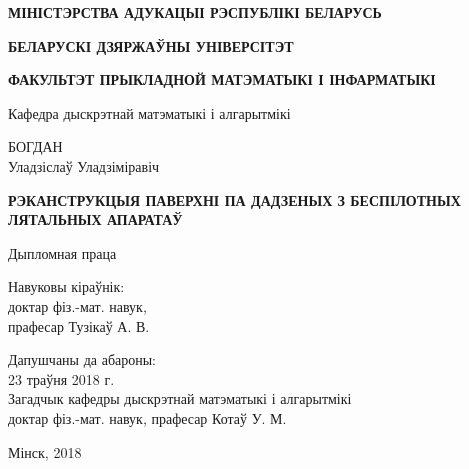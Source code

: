 \begin{titlepage}
    \begin{center}
        {\bf МІНІСТЭРСТВА АДУКАЦЫІ РЭСПУБЛІКІ БЕЛАРУСЬ}
    \end{center}
    \begin{center}
        {\bf БЕЛАРУСКІ ДЗЯРЖАЎНЫ УНІВЕРСІТЭТ}
    \end{center}
    \begin{center}
        {\bf ФАКУЛЬТЭТ ПРЫКЛАДНОЙ МАТЭМАТЫКІ І ІНФАРМАТЫКІ}
    \end{center}
    \begin{center}
        Кафедра дыскрэтнай матэматыкі і алгарытмікі
    \end{center}

    \vspace{4em}

    \begin{center}
        БОГДАН \\
        Уладзіслаў Уладзіміравіч
    \end{center}

    \vspace{2em}

    \begin{center}
        \textbf{
          РЭКАНСТРУКЦЫЯ ПАВЕРХНІ ПА ДАДЗЕНЫХ З БЕСПІЛОТНЫХ ЛЯТАЛЬНЫХ АПАРАТАЎ
        }
    \end{center}

    \vspace{1em}

    \begin{center}
        Дыпломная праца
    \end{center}

    \vspace{2em}

    \begin{flushright}
        Навуковы кіраўнік:\\
        доктар фіз.-мат. навук, \\
        прафесар Тузікаў А. В. \\
    \end{flushright}

    \vspace{1em}

    \begin{flushleft}
        Дапушчаны да абароны: \\
        \vspace{0.5em}
        23 траўня 2018 г. \\
        \vspace{0.5em}
        Загадчык кафедры дыскрэтнай матэматыкі і алгарытмікі \\
        доктар фіз.-мат. навук, прафесар Котаў У. М. \\
    \end{flushleft}

    \vfill

    \begin{center}
        Мінск, 2018
    \end{center}
\end{titlepage}
\newpage
